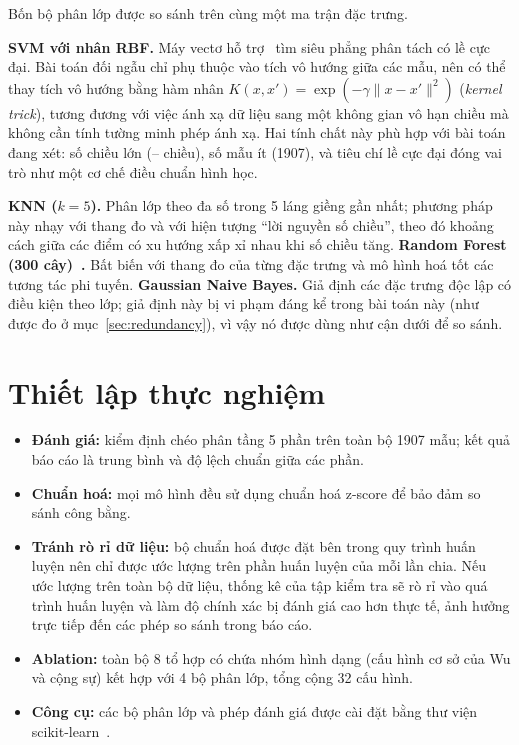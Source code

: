 \documentclass[11pt,a4paper]{article}
\begin{document}
Bốn bộ phân lớp được so sánh trên cùng một ma trận đặc trưng.

\textbf{SVM với nhân RBF.} Máy vectơ hỗ trợ~\cite{cortes1995} tìm siêu phẳng phân tách có lề cực đại.
Bài toán đối ngẫu chỉ phụ thuộc vào tích vô hướng giữa các mẫu, nên có thể thay tích vô hướng bằng
hàm nhân $K(x,x') = \exp(-\gamma\|x-x'\|^2)$ (\emph{kernel trick}), tương đương với việc ánh xạ dữ
liệu sang một không gian vô hạn chiều mà không cần tính tường minh phép ánh xạ. Hai tính chất này phù
hợp với bài toán đang xét: số chiều lớn (\bestdims{}--\totaldims{} chiều), số mẫu ít (1907), và tiêu
chí lề cực đại đóng vai trò như một cơ chế điều chuẩn hình học.

\textbf{KNN ($k=5$).} Phân lớp theo đa số trong 5 láng giềng gần nhất; phương pháp này nhạy với thang
đo và với hiện tượng ``lời nguyền số chiều'', theo đó khoảng cách giữa các điểm có xu hướng xấp xỉ
nhau khi số chiều tăng. \textbf{Random Forest (300 cây)~\cite{breiman2001}.} Bất biến với thang đo của
từng đặc trưng và mô hình hoá tốt các tương tác phi tuyến. \textbf{Gaussian Naive Bayes.} Giả định các
đặc trưng độc lập có điều kiện theo lớp; giả định này bị vi phạm đáng kể trong bài toán này (như được
đo ở mục~\ref{sec:redundancy}), vì vậy nó được dùng như cận dưới để so sánh.

\section{Thiết lập thực nghiệm}

\begin{itemize}
  \item \textbf{Đánh giá:} kiểm định chéo phân tầng 5 phần trên toàn bộ 1907 mẫu; kết quả báo cáo là
        trung bình và độ lệch chuẩn giữa các phần.
  \item \textbf{Chuẩn hoá:} mọi mô hình đều sử dụng chuẩn hoá z-score để bảo đảm so sánh công bằng.
  \item \textbf{Tránh rò rỉ dữ liệu:} bộ chuẩn hoá được đặt bên trong quy trình huấn luyện nên chỉ
        được ước lượng trên phần huấn luyện của mỗi lần chia. Nếu ước lượng trên toàn bộ dữ liệu,
        thống kê của tập kiểm tra sẽ rò rỉ vào quá trình huấn luyện và làm độ chính xác bị đánh giá
        cao hơn thực tế, ảnh hưởng trực tiếp đến các phép so sánh trong báo cáo.
  \item \textbf{Ablation:} toàn bộ 8 tổ hợp có chứa nhóm hình dạng (cấu hình cơ sở của Wu và cộng sự)
        kết hợp với 4 bộ phân lớp, tổng cộng 32 cấu hình.
  \item \textbf{Công cụ:} các bộ phân lớp và phép đánh giá được cài đặt bằng thư viện
        scikit-learn~\cite{pedregosa2011}.
\end{itemize}
\end{document}
